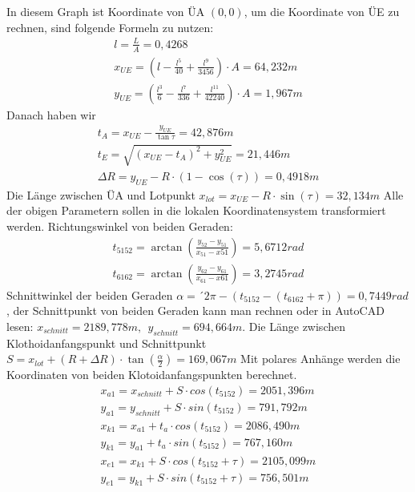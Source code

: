 \documentclass[12pt]{article}
\begin{document}
In diesem Graph ist Koordinate von ÜA $(0,0)$, um die Koordinate von ÜE zu rechnen, sind folgende Formeln zu nutzen:
\begin{gather*}
l = \frac{L}{A} = 0,4268\\
x_{UE} = (l - \frac{l^5}{40} + \frac{l^9}{3456}) \cdot A = 64,232m\\
y_{UE} = (\frac{l^3}{6} - \frac{l^7}{336} + \frac{l^{11}}{42240}) \cdot A =  1,967m
\end{gather*}
Danach haben wir
\begin{gather*}
t_A = x_{UE} - \frac{y_{UE}}{\tan \tau} = 42,876m \\
t_E = \sqrt{(x_{UE} - t_A)^2 + y_{UE}^2} = 21,446m \\
\Delta R = y_{UE} - R \cdot (1 - \cos (\tau)) = 0,4918 m 
\end{gather*}
Die Länge zwischen ÜA und Lotpunkt $x_{lot} = x_{UE} - R \cdot \sin(\tau) = 32,134m$ \newline
\newline
Alle der obigen Parametern sollen in die lokalen Koordinatensystem transformiert werden. \newline
Richtungswinkel von beiden Geraden:
\begin{gather*}
t_{5152} = \arctan(\frac{y_{52} - y_{51}}{x_{51} - x{51}}) = 5,6712 rad\\
t_{6162} = \arctan(\frac{y_{62} - y_{61}}{x_{61} - x{61}}) = 3,2745 rad
\end{gather*}
Schnittwinkel der beiden Geraden $\alpha =´2 \pi - (t_{5152} - (t_{6162} + \pi)) = 0,7449rad$, der Schnittpunkt von beiden Geraden kann man rechnen oder in AutoCAD lesen: $x_{schnitt} = 2189,778m,\ \ y_{schnitt} = 694,664m$. Die Länge zwischen Klothoidanfangspunkt und Schnittpunkt $S = x_{lot} + (R + \Delta R) \cdot \tan (\frac{\alpha}{2}) = 169,067m$ \newline
Mit polares Anhänge werden die Koordinaten von beiden Klotoidanfangspunkten berechnet.
\begin{gather*}
x_{a1} = x_{schnitt} + S \cdot cos(t_{5152}) = 2051,396m \\
y_{a1} = y_{schnitt} + S \cdot sin(t_{5152}) = 791,792m \\
x_{k1} = x_{a1} + t_a \cdot cos(t_{5152}) = 2086,490m \\
y_{k1} = y_{a1} + t_a \cdot sin(t_{5152}) = 767,160m \\
x_{e1} = x_{k1} + S \cdot cos(t_{5152} + \tau) = 2105,099m \\
y_{e1} = y_{k1} + S \cdot sin(t_{5152} + \tau) = 756,501m 
\end{gather*}
\end{document}
